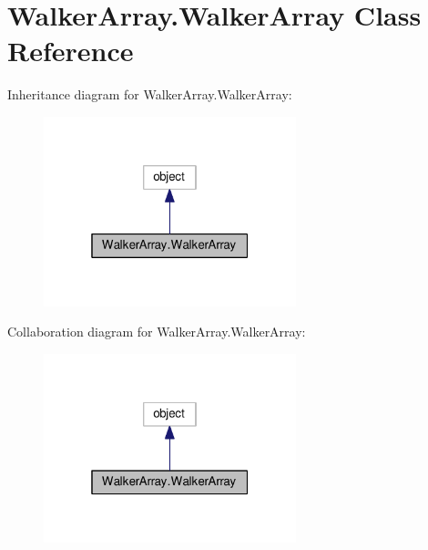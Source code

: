 \hypertarget{classWalkerArray_1_1WalkerArray}{}\section{Walker\+Array.\+Walker\+Array Class Reference}
\label{classWalkerArray_1_1WalkerArray}


Inheritance diagram for Walker\+Array.\+Walker\+Array\+:
\nopagebreak
\begin{figure}[H]
\begin{center}
\leavevmode
\includegraphics[width=208pt]{classWalkerArray_1_1WalkerArray__inherit__graph}
\end{center}
\end{figure}


Collaboration diagram for Walker\+Array.\+Walker\+Array\+:
\nopagebreak
\begin{figure}[H]
\begin{center}
\leavevmode
\includegraphics[width=208pt]{classWalkerArray_1_1WalkerArray__coll__graph}
\end{center}
\end{figure}
